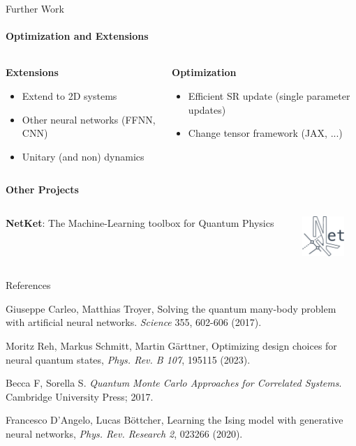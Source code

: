 \documentclass{beamer}
\begin{document}
\begin{frame}{Further Work}
\framesubtitle{Optimization and Extensions}
\begin{columns}
\begin{column}{0.5\textwidth}
\textbf{Extensions}
\begin{itemize}
	\item Extend to 2D systems
	\item Other neural networks (FFNN, CNN)
	\item Unitary (and non) dynamics
\end{itemize}
\end{column}
\begin{column}{0.5\textwidth}
\textbf{Optimization}
\begin{itemize}
	\item Efficient SR update (single parameter updates)
	\item Change tensor framework (JAX, ...)
\end{itemize}
\end{column}
\end{columns}
\baselineskip
\textbf{Other Projects}

\begin{columns}
\begin{column}{0.8\textwidth}
\textbf{NetKet}: The Machine-Learning toolbox for Quantum Physics
\end{column}
\begin{column}{0.18\textwidth}
\begin{center}	
\includegraphics[height=1.5cm]{images/netket.png}
\end{center}
\end{column}
\end{columns}
\end{frame}

\begin{frame}{References}
\begin{thebibliography}{99}
Giuseppe Carleo, Matthias Troyer, Solving the quantum many-body problem with artificial neural networks. \textit{Science} 355, 602-606 (2017).

Moritz Reh, Markus Schmitt, Martin Gärttner, Optimizing design choices for neural quantum states, \textit{Phys. Rev. B 107}, 195115 (2023).

Becca F, Sorella S. \textit{Quantum Monte Carlo Approaches for Correlated Systems}. Cambridge University Press; 2017.

Francesco D'Angelo, Lucas Böttcher, Learning the Ising model with generative neural networks, \textit{Phys. Rev. Research 2}, 023266 (2020).
\end{thebibliography}
\end{frame}
\end{document}
